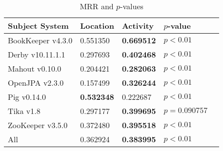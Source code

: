 \begin{table}[t]
\renewcommand{\arraystretch}{1.3}
\footnotesize
\centering
\caption{MRR and $p$-values}
\begin{tabular}{l|ll|ll}
\toprule
Subject System & Location & Activity & $p$-value  \\
\midrule
BookKeeper v4.3.0 & 0.551350 & {\bf 0.669512 } & $p < 0.01$ \\
Derby v10.11.1.1 & 0.297693 & {\bf 0.402468 } & $p < 0.01$ \\
Mahout v0.10.0 & 0.204421 & {\bf 0.282063 } & $p < 0.01$ \\
OpenJPA v2.3.0 & 0.157499 & {\bf 0.326244 } & $p < 0.01$ \\
Pig v0.14.0 & {\bf 0.532348 } & 0.222687 & $p < 0.01$ \\
Tika v1.8 & 0.297177 & {\bf 0.399695 } & $p = 0.090757$ \\
ZooKeeper v3.5.0 & 0.372480 & {\bf 0.395518 } & $p < 0.01$ \\
\midrule
All & 0.362924 & {\bf 0.383995 } & $p < 0.01$ \\
\bottomrule
\end{tabular}
\label{table:rq1:file:lda}
\end{table}
